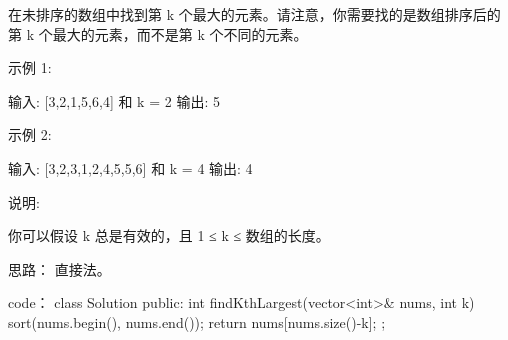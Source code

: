 在未排序的数组中找到第 k 个最大的元素。请注意，你需要找的是数组排序后的第 k 个最大的元素，而不是第 k 个不同的元素。

示例 1:

输入: [3,2,1,5,6,4] 和 k = 2
输出: 5

示例 2:

输入: [3,2,3,1,2,4,5,5,6] 和 k = 4
输出: 4

说明:

你可以假设 k 总是有效的，且 1 ≤ k ≤ 数组的长度。































思路：
直接法。
































code：
class Solution {
public:
    int findKthLargest(vector<int>& nums, int k) {
        sort(nums.begin(), nums.end());
        return nums[nums.size()-k];
    }
};